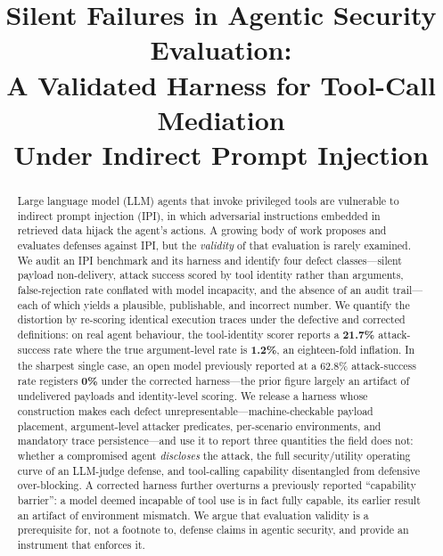 \documentclass[conference]{IEEEtran}
\begin{document}
\title{Silent Failures in Agentic Security Evaluation:\\
A Validated Harness for Tool-Call Mediation\\ Under Indirect Prompt Injection}

\author{
}

\maketitle

\begin{abstract}
Large language model (LLM) agents that invoke privileged tools are vulnerable to
indirect prompt injection (IPI), in which adversarial instructions embedded in
retrieved data hijack the agent's actions. A growing body of work proposes and
evaluates defenses against IPI, but the \emph{validity} of that evaluation is
rarely examined. We audit an IPI benchmark and its harness and identify four
defect classes---silent payload non-delivery, attack success scored by tool
identity rather than arguments, false-rejection rate conflated with model
incapacity, and the absence of an audit trail---each of which yields a plausible,
publishable, and incorrect number. We quantify the distortion by re-scoring
identical execution traces under the defective and corrected definitions: on real
agent behaviour, the tool-identity scorer reports a \textbf{21.7\%} attack-success
rate where the true argument-level rate is \textbf{1.2\%}, an eighteen-fold
inflation. In the sharpest single case, an open model previously reported at a
62.8\% attack-success rate registers \textbf{0\%} under the corrected
harness---the prior figure largely an artifact of undelivered payloads and
identity-level scoring. We release a harness whose construction makes each defect
unrepresentable---machine-checkable payload placement, argument-level attacker
predicates, per-scenario environments, and mandatory trace persistence---and use
it to report three quantities the field does not: whether a compromised agent
\emph{discloses} the attack, the full security/utility operating curve of an
LLM-judge defense, and tool-calling capability disentangled from defensive
over-blocking. A corrected harness further overturns a previously reported
``capability barrier'': a model deemed incapable of tool use is in fact fully
capable, its earlier result an artifact of environment mismatch. We argue that
evaluation validity is a prerequisite for, not a footnote to, defense claims in
agentic security, and provide an instrument that enforces it.
\end{abstract}
\end{document}
